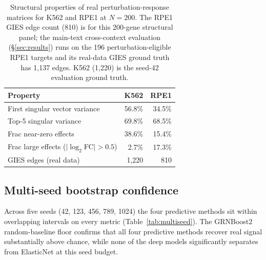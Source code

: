\documentclass{article}
\theoremstyle{plain}
\theoremstyle{definition}
\theoremstyle{remark}
\begin{document}
\begin{table}[h]
\centering
\small
\begin{tabular}{lrr}
\toprule
\textbf{Property} & \textbf{K562} & \textbf{RPE1} \\
\midrule
First singular vector variance     & 56.8\% & 34.5\% \\
Top-5 singular variance            & 69.8\% & 68.5\% \\
Frac near-zero effects             & 38.6\% & 15.4\% \\
Frac large effects ($|\log_2$FC$|>0.5$) & 2.7\%  & 17.3\% \\
GIES edges (real data)             & 1{,}220 & 810 \\
\bottomrule
\end{tabular}
\caption{Structural properties of real perturbation-response matrices for K562 and RPE1 at $N{=}200$. The RPE1 GIES edge count (810) is for this 200-gene structural panel; the main-text cross-context evaluation (\S\ref{sec:results}) runs on the 196 perturbation-eligible RPE1 targets and its real-data GIES ground truth has 1{,}137 edges. K562 (1{,}220) is the seed-42 evaluation ground truth.}
\end{table}

\subsection{Multi-seed bootstrap confidence}
\label{app:multi_seed}

Across five seeds (42, 123, 456, 789, 1024) the four predictive methods sit within overlapping intervals on every metric (Table~\ref{tab:multiseed}). The GRNBoost2 random-baseline floor confirms that all four predictive methods recover real signal substantially above chance, while none of the deep models significantly separates from ElasticNet at this seed budget.
\end{document}
